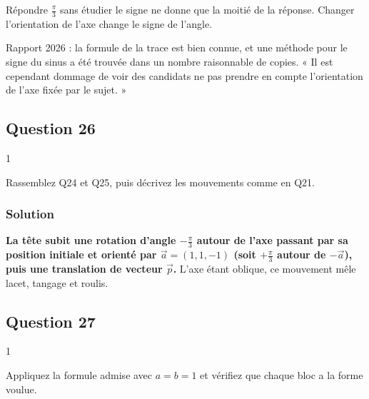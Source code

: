 \documentclass[11pt,a4paper]{article}
\begin{document}
\begin{piege}

Répondre \(\frac\pi3\) sans étudier le signe ne donne que la moitié de la réponse. Changer l'orientation de l'axe change le signe de l'angle.

\end{piege}

\begin{jury}

Rapport 2026 : la formule de la trace est bien connue, et une méthode pour le signe du sinus a été trouvée dans un nombre raisonnable de copies. « Il est cependant dommage de voir des candidats ne pas prendre en compte l'orientation de l'axe fixée par le sujet. »

\end{jury}

\hypertarget{question-26}{%
\subsection{Question 26}\label{question-26}}

\begin{indication}{1}

Rassemblez Q24 et Q25, puis décrivez les mouvements comme en Q21.

\end{indication}

\hypertarget{solution-25}{%
\subsubsection{Solution}\label{solution-25}}

\textbf{La tête subit une rotation d'angle \(-\frac\pi3\) autour de l'axe passant par sa position initiale et orienté par \(\vec a=(1,1,-1)\) (soit \(+\frac\pi3\) autour de \(-\vec a\)), puis une translation de vecteur \(\vec p\).} L'axe étant oblique, ce mouvement mêle lacet, tangage et roulis.

\hypertarget{question-27}{%
\subsection{Question 27}\label{question-27}}

\begin{indication}{1}

Appliquez la formule admise avec \(a=b=1\) et vérifiez que chaque bloc a la forme voulue.

\end{indication}
\end{document}
